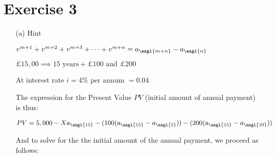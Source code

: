 \documentclass[12pt,a4paper]{article}
\begin{document}
\section*{Exercise 3}
\begin{enumerate}
		\item[(a)] Hint
		
				   $v^{m+1}  + v^{m+2} + v^{m+3} + \dots  + v^{m+n}   = a_{\angl{m+n}}  - a_{\angl{n}}$
				   
$\pounds 15,00 \implies 15 \text{ years}  + \pounds 100 \text{ and } \pounds 200 $

At interest rate $ i = 4\% \text{ per annum }  =  0.04 $

The expression for the Present Value $PV$ (initial amount of annual payment) is thus:

\begin{align*}
PV =  5,000  -  Xa_{ \angl{15} } - (100 (a_{ \angl{15} }  - a_{ \angl{5} } )) -  (200( a_{ \angl{15} }  - a_{ \angl{10} })) 
\end{align*}

And to solve for the the initial amount of the annual payment, we proceed as follows:


\end{enumerate}
\end{document}
